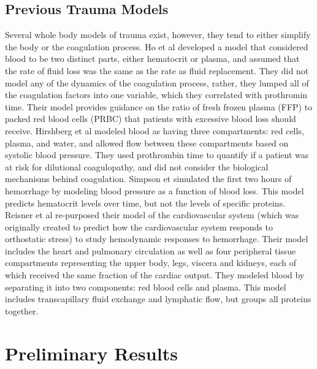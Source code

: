 \documentclass[12pt]{article}
\begin{document}
\subsection*{Previous Trauma Models}
Several whole body models of trauma exist, however, they tend to either simplify the body or the coagulation process. 
Ho et al developed a model that considered blood to be two distinct parts, either hematocrit or plasma, and assumed that the rate of fluid loss was the same as the rate as fluid replacement. They did not model any of the dynamics of the coagulation process, rather, they lumped all of the coagulation factors into one variable, which they correlated with prothromin time. \cite{ho2005mathematical} Their model provides guidance on the ratio of fresh frozen plasma (FFP) to packed red blood cells (PRBC) that patients with excessive blood loss should receive. 
Hirshberg et al modeled blood as having three compartments: red cells, plasma, and water, and allowed flow between these compartments based on systolic blood pressure. \cite{hirshberg2003minimizing} They used prothrombin time to quantify if a patient was at risk for dilutional coagulopathy, and did not consider the biological mechanisms behind coagulation.
Simpson et simulated the first two hours of hemorrhage by modeling blood pressure as a function of blood loss.\cite{simpson1996computer} This model predicts hematocrit levels over time, but not the levels of specific proteins. 
Reisner et al re-purposed their model of the cardiovascular system (which was originally created to predict how the cardiovascular system responds to orthostatic stress) to study hemodynamic responses to hemorrhage.\cite{reisner2013computational} Their model includes the heart and pulmonary circulation as well as four peripheral tissue compartments representing the upper body, legs, viscera and kidneys, each of which received the same fraction of the cardiac output. They modeled blood by separating it into two components: red blood cells and plasma. This model includes transcapillary fluid exchange and lymphatic flow, but groups all proteins together. 
\section*{Preliminary Results}
\end{document}
